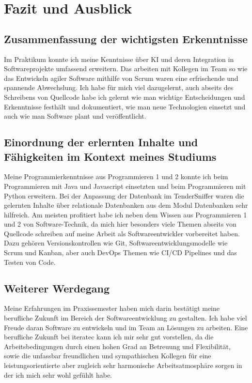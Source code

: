 \chapter{Fazit und Ausblick}


\section{Zusammenfassung der wichtigsten Erkenntnisse}
Im Praktikum konnte ich meine Kenntnisse über KI und deren Integration in Softwareprojekte umfassend erweitern. Das
arbeiten mit Kollegen im Team so wie das Entwickeln agiler Software mithilfe von Scrum waren eine erfrischende und
spannende Abwechslung. Ich habe für mich viel dazugelernt, auch abseits des Schreibens von Quellcode habe ich gelernt
wie man wichtige Entscheidungen und Erkenntnisse festhält und dokumentiert, wie man neue Technologien einsetzt und auch
wie man Software plant und veröffentlicht.


\section{Einordnung der erlernten Inhalte und Fähigkeiten im Kontext meines Studiums}
Meine Programmierkenntnisse aus Programmieren 1 und 2 konnte ich beim Programmieren mit Java und Javascript einsetzten und beim
Programmieren mit Python erweitern. Bei der Anpassung der Datenbank im TenderSniffer waren die gelernten Inhalte über
relationale Datenbanken aus dem Modul Datenbanken sehr hilfreich. Am meisten profitiert habe ich neben dem Wissen aus
Programmieren 1 und 2 von Software-Technik, da mich hier besonders viele Themen abseits von Quellcode schreiben auf
meine Arbeit als Softwareentwickler vorbereitet haben. Dazu gehören Versionskontrollen wie Git, Softwareentwicklungsmodelle wie Scrum und
Kanban, aber auch DevOps Themen wie CI/CD Pipelines und das Testen von Code.


\section{Weiterer Werdegang}
Meine Erfahrungen im Praxissemester haben mich darin bestätigt meine berufliche Zukunft im Bereich der
Softwareentwicklung zu gestalten. Ich habe viel Freude daran Software zu entwickeln und im Team an Lösungen zu arbeiten. 
Eine berufliche Zukunft bei iteratec kann ich mir sehr gut vorstellen, da die Arbeitsbedingungen durch einen hohen Grad
an Betreuung und Flexibilität, sowie die unfassbar freundlichen und sympathischen Kollegen für eine leistungsorientierte
aber zugleich sehr harmonische Arbeitsatmosphäre sorgen in der ich mich sehr wohl gefühlt habe.